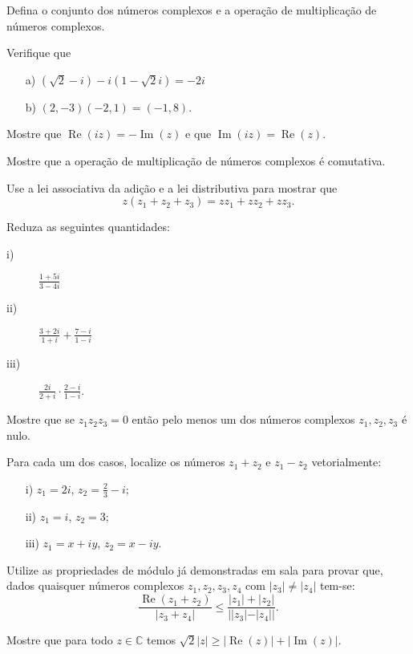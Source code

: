 
\problem
Defina o conjunto dos n\'umeros complexos e a opera\c c\~ao de multiplica\c c\~ao de n\'umeros complexos.



\problem
 Verifique que 
\begin{itemize}
\item[a)] $(\sqrt{2} - i) - i(1-\sqrt{2}i) = -2i$
\item[b)] $(2,-3)(-2,1)=(-1,8)$.
\end{itemize}



\problem
Mostre que $\operatorname{Re}(iz) = -\operatorname{Im}(z)$ e que $ \operatorname{Im}(iz) = \operatorname{Re}(z)$.



\problem
Mostre que a opera\c c\~ao de multiplica\c c\~ao de n\'umeros complexos \'e comutativa.


\problem
Use a lei associativa da adi\c c\~ao e a lei distributiva para mostrar que
\[z(z_1+z_2+z_3) = zz_1+zz_2+zz_3.\]



\problem
Reduza as seguintes quantidades:
\begin{description}
\item[i)] $\frac{1+5i}{3-4i}$
\item[ii)] $\frac{3+2i}{1+i} + \frac{7-i}{1-i}$
\item[iii)]$\frac{2i}{2+i}\cdot \frac{2-i}{1-i}$.
\end{description}



\problem
Mostre que se $z_1z_2z_3=0$ ent\~ao pelo menos um dos n\'umeros complexos $z_1,z_2,z_3$ \'e nulo.

\problem
Para cada um dos casos, localize os n\'umeros $z_1+z_2$ e $z_1-z_2$ vetorialmente:
\begin{itemize}
\item[i)] $z_1 = 2i$, $z_2 = \frac{2}{3} - i$;
\item[ii)] $z_1 = i$, $z_2= 3$;
\item[iii)] $z_1 = x+iy$, $z_2 = x-iy$.
\end{itemize}

\problem
Utilize as propriedades de m\'odulo j\'a demonstradas em sala para provar que, dados quaisquer n\'umeros complexos $z_1,z_2,z_3,z_4$ com $|z_3| \ne |z_4|$ tem-se:
\[\frac{\operatorname{Re}(z_1+z_2)}{|z_3+z_4|} \leq \frac{|z_1|+|z_2|}{||z_3|-|z_4||}.\]

\problem
Mostre que para todo $z\in \mathbb C$ temos $\sqrt{2} |z| \geq |\operatorname{Re}(z)| + |\operatorname{Im}(z)|$.

